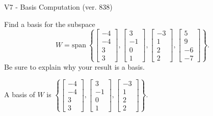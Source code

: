 \begin{exercise}
  \begin{exerciseTitle}V7 - Basis Computation (ver. 838)\end{exerciseTitle}
  \begin{exerciseStatement}
    Find a basis for the subspace 
\[W=\mathrm{span}\ \left\{\left[\begin{array}{r}
-4 \\
-4 \\
3 \\
3
\end{array}\right] , \left[\begin{array}{r}
3 \\
-1 \\
0 \\
1
\end{array}\right] , \left[\begin{array}{r}
-3 \\
1 \\
2 \\
2
\end{array}\right] , \left[\begin{array}{r}
5 \\
9 \\
-6 \\
-7
\end{array}\right]\right\}.\]
 Be sure to explain why your result is a basis.


  \end{exerciseStatement}
  \begin{exerciseAnswer}
   A basis of \(W\) is  \(\left\{\left[\begin{array}{r}
-4 \\
-4 \\
3 \\
3
\end{array}\right] , \left[\begin{array}{r}
3 \\
-1 \\
0 \\
1
\end{array}\right] , \left[\begin{array}{r}
-3 \\
1 \\
2 \\
2
\end{array}\right]\right\}\).
  


  \end{exerciseAnswer}
\end{exercise}